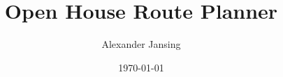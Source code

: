 \documentclass[letterpaper,11pt]{report}
\title{Open House Route Planner}
\author{Alexander Jansing}
\date{\today} %
\theoremstyle{definition}
\theoremstyle{definition}
\begin{document}
%
\nocite{*}

\begin{romanpages}      %
    \ApprovalPage   %
    \TitlePage 
    \CopyrightPage  %
    
    
    
    
    
    
    
    \StylePage
    \tableofcontents
    
    \listoffigures
    
\end{romanpages}        %
\end{document}
